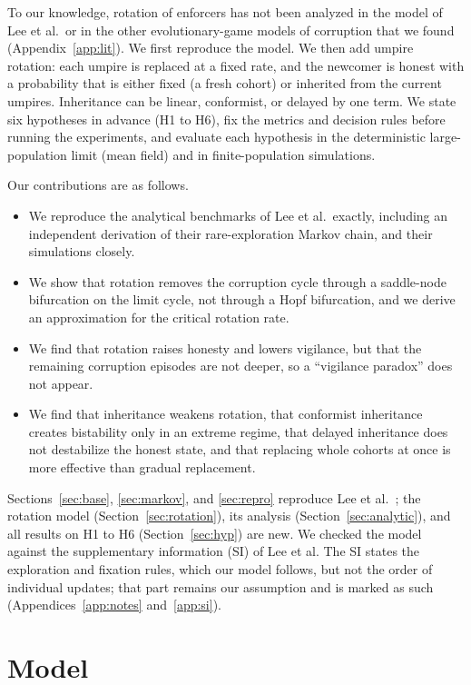 \documentclass[journal]{IEEEtran}
\begin{document}
To our knowledge, rotation of enforcers has not been analyzed in the model of Lee et al.\ or in
the other evolutionary-game models of corruption that we found (Appendix~\ref{app:lit}). We first
reproduce the model. We then add umpire rotation: each umpire is replaced at a fixed rate, and the
newcomer is honest with a probability that is either fixed (a fresh cohort) or inherited from the
current umpires. Inheritance can be linear, conformist, or delayed by one term. We state six
hypotheses in advance (H1 to H6), fix the metrics and decision rules before running the
experiments, and evaluate each hypothesis in the deterministic large-population limit (mean
field) and in finite-population simulations.

Our contributions are as follows.
\begin{itemize}
\item We reproduce the analytical benchmarks of Lee et al.\ exactly, including an independent
derivation of their rare-exploration Markov chain, and their simulations closely.
\item We show that rotation removes the corruption cycle through a saddle-node bifurcation on the
limit cycle, not through a Hopf bifurcation, and we derive an approximation for the critical
rotation rate.
\item We find that rotation raises honesty and lowers vigilance, but that the remaining corruption
episodes are not deeper, so a ``vigilance paradox'' does not appear.
\item We find that inheritance weakens rotation, that conformist inheritance creates bistability
only in an extreme regime, that delayed inheritance does not destabilize the honest state, and
that replacing whole cohorts at once is more effective than gradual replacement.
\end{itemize}

Sections~\ref{sec:base}, \ref{sec:markov}, and \ref{sec:repro} reproduce Lee et
al.~\cite{lee2019social}; the rotation model (Section~\ref{sec:rotation}), its analysis
(Section~\ref{sec:analytic}), and all results on H1 to H6 (Section~\ref{sec:hyp}) are new.
We checked the model
against the supplementary information (SI) of Lee et al. The SI states the exploration and
fixation rules, which our model follows, but not the order of individual updates; that part
remains our assumption and is marked as such (Appendices~\ref{app:notes} and~\ref{app:si}).

\section{Model}
\end{document}

